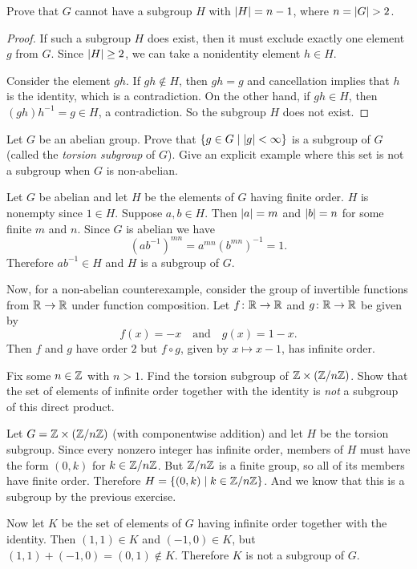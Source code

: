  Prove that $G$ cannot have a subgroup $H$ with
$\lvert{H}\rvert = n - 1$, where $n = \lvert{G}\rvert > 2$.
\begin{proof}
  If such a subgroup $H$ does exist, then it must exclude exactly one
  element $g$ from $G$. Since $\lvert{H}\rvert\geq2$, we can take a nonidentity
  element $h\in H$.

  Consider the element $gh$. If $gh\not\in H$, then $gh = g$ and
  cancellation implies that $h$ is the identity, which is a
  contradiction. On the other hand, if $gh\in H$, then
  $(gh)h^{-1} = g\in H$, a contradiction. So the subgroup $H$ does not
  exist.
\end{proof}

 Let $G$ be an abelian group. Prove that
$\{g\in G\mid\lvert{g}\rvert<\infty\}$ is a subgroup of $G$ (called the {\em
  torsion subgroup} of $G$). Give an explicit example where this set
is not a subgroup when $G$ is non-abelian.
\begin{solution}
  Let $G$ be abelian and let $H$ be the elements of $G$ having finite
  order. $H$ is nonempty since $1\in H$. Suppose $a,b\in H$. Then
  $\lvert{a}\rvert = m$ and $\lvert{b}\rvert = n$ for some finite $m$ and $n$. Since
  $G$ is abelian we have
  \begin{equation*}
    (ab^{-1})^{mn} = a^{mn}(b^{mn})^{-1} = 1.
  \end{equation*}
  Therefore $ab^{-1}\in H$ and $H$ is a subgroup of $G$.

  Now, for a non-abelian counterexample, consider the group of
  invertible functions from $\mathbb{R}\to\mathbb{R}$ under function composition. Let
  $f\colon\mathbb{R}\to\mathbb{R}$ and $g\colon\mathbb{R}\to\mathbb{R}$ be given by
  \begin{equation*}
    f(x) = -x
    \quad\text{and}\quad
    g(x) = 1 - x.
  \end{equation*}
  Then $f$ and $g$ have order $2$ but $f\circ g$, given by
  $x\mapsto x - 1$, has infinite order.
\end{solution}

 Fix some $n\in\mathbb{Z}$ with $n > 1$. Find the torsion subgroup
of $\mathbb{Z}\times(\mathbb{Z}/n\mathbb{Z})$. Show that the set of elements of infinite order
together with the identity is {\em not} a subgroup of this direct
product.
\begin{solution}
  Let $G = \mathbb{Z}\times(\mathbb{Z}/n\mathbb{Z})$ (with componentwise addition) and let $H$
  be the torsion subgroup. Since every nonzero integer has infinite
  order, members of $H$ must have the form $(0, k)$ for
  $k\in\mathbb{Z}/n\mathbb{Z}$. But $\mathbb{Z}/n\mathbb{Z}$ is a finite group, so all of its members
  have finite order. Therefore $H = \{ (0, k) \mid k\in\mathbb{Z}/n\mathbb{Z} \}$. And
  we know that this is a subgroup by the previous exercise.

  Now let $K$ be the set of elements of $G$ having infinite order
  together with the identity. Then $(1, 1)\in K$ and $(-1, 0)\in K$,
  but $(1,1) + (-1,0) = (0, 1)\not\in K$. Therefore $K$ is not a
  subgroup of $G$.
\end{solution}
